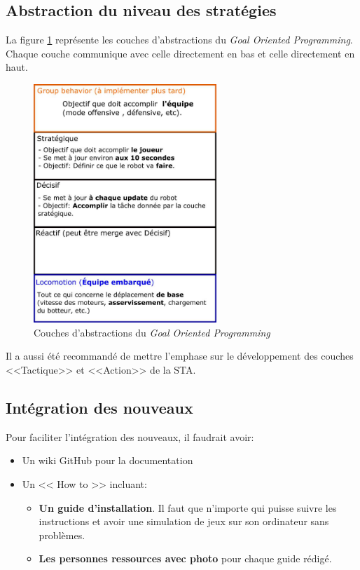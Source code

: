 \documentclass[12pt,letterpaper,twoside]{article}
\begin{document}
\subsection*{Abstraction du niveau des stratégies}
La figure \ref{fig:gpo} représente les couches d'abstractions du \textit{Goal Oriented Programming}.
Chaque couche communique avec celle directement en bas et celle directement en haut.

\begin{figure}[htp]
\label{fig:gpo}
\centering
\includegraphics[height=9cm,keepaspectratio]{gpo_couches.png}
\caption{Couches d'abstractions du \textit{Goal Oriented Programming}}
\end{figure}

Il a aussi été recommandé de mettre l'emphase sur le développement des couches <<Tactique>> et <<Action>> de la STA.

\subsection*{Intégration des nouveaux}
Pour faciliter l'intégration des nouveaux, il faudrait avoir:
\begin{itemize}
\item Un wiki GitHub pour la documentation
\item Un << How to >> incluant:
\begin{itemize}
\item \textbf{Un guide d'installation}.
Il faut que n'importe qui puisse suivre les instructions et avoir une simulation de jeux sur son ordinateur sans problèmes.
\item \textbf{Les personnes ressources avec photo} pour chaque guide rédigé.
\end{itemize}
\end{itemize}
\end{document}
